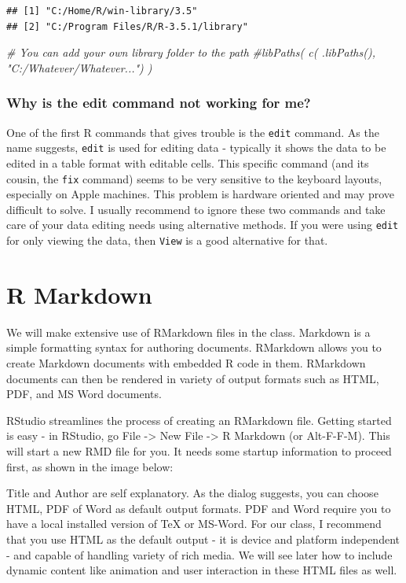 \documentclass[]{krantz}
\makeatletter
\newenvironment{Shaded}{\begin{snugshade}}{\end{snugshade}}
\newcommand{\CommentTok}[1]{\textcolor[rgb]{0.37,0.37,0.37}{\textit{#1}}}
\newenvironment{kframe}{%
\medskip{}
\setlength{\fboxsep}{.8em}
 \def\at@end@of@kframe{}%
 \ifinner\ifhmode%
  \def\at@end@of@kframe{\end{minipage}}%
  \begin{minipage}{\columnwidth}%
 \fi\fi%
 \def\FrameCommand##1{\hskip\@totalleftmargin \hskip-\fboxsep
 \colorbox{shadecolor}{##1}\hskip-\fboxsep
     \hskip-\linewidth \hskip-\@totalleftmargin \hskip\columnwidth}%
 \MakeFramed {\advance\hsize-\width
   \@totalleftmargin\z@ \linewidth\hsize
   \@setminipage}}%
 {\par\unskip\endMakeFramed%
 \at@end@of@kframe}
\renewenvironment{Shaded}{\begin{kframe}}{\end{kframe}}
\makeatother
\begin{document}
\begin{verbatim}
## [1] "C:/Home/R/win-library/3.5"         
## [2] "C:/Program Files/R/R-3.5.1/library"
\end{verbatim}

\begin{Shaded}
\begin{Highlighting}[]
\CommentTok{# You can add your own library folder to the path}
\CommentTok{#libPaths( c( .libPaths(), "C:/Whatever/Whatever...") )}
\end{Highlighting}
\end{Shaded}

\subsection{Why is the edit command not working for
me?}\label{why-is-the-edit-command-not-working-for-me}

One of the first R commands that gives trouble is the \texttt{edit}
command. As the name suggests, \texttt{edit} is used for editing data -
typically it shows the data to be edited in a table format with editable
cells. This specific command (and its cousin, the \texttt{fix} command)
seems to be very sensitive to the keyboard layouts, especially on Apple
machines. This problem is hardware oriented and may prove difficult to
solve. I usually recommend to ignore these two commands and take care of
your data editing needs using alternative methods. If you were using
\texttt{edit} for only viewing the data, then \texttt{View} is a good
alternative for that.

\chapter{R Markdown}\label{r-markdown}

We will make extensive use of RMarkdown files in the class. Markdown is
a simple formatting syntax for authoring documents. RMarkdown allows you
to create Markdown documents with embedded R code in them. RMarkdown
documents can then be rendered in variety of output formats such as
HTML, PDF, and MS Word documents.

RStudio streamlines the process of creating an RMarkdown file. Getting
started is easy - in RStudio, go File -\textgreater{} New File
-\textgreater{} R Markdown (or Alt-F-F-M). This will start a new RMD
file for you. It needs some startup information to proceed first, as
shown in the image below:

Title and Author are self explanatory. As the dialog suggests, you can
choose HTML, PDF of Word as default output formats. PDF and Word require
you to have a local installed version of TeX or MS-Word. For our class,
I recommend that you use HTML as the default output - it is device and
platform independent - and capable of handling variety of rich media. We
will see later how to include dynamic content like animation and user
interaction in these HTML files as well.
\end{document}
